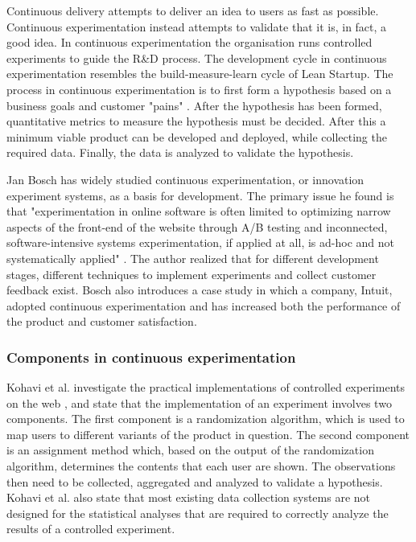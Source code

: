 \documentclass[english]{tktltiki2}
\theoremstyle{definition}
\theoremstyle{remark}
\begin{document}
Continuous delivery attempts to deliver an idea to users as fast as possible. Continuous experimentation instead attempts to validate that it is, in fact, a good idea. In continuous experimentation the organisation runs controlled experiments to guide the R\&D process. The development cycle in continuous experimentation resembles the build-measure-learn cycle of Lean Startup. The process in continuous experimentation is to first form a hypothesis based on a business goals and customer "pains" \cite{bosch2012building}. After the hypothesis has been formed, quantitative metrics to measure the hypothesis must be decided. After this a minimum viable product can be developed and deployed, while collecting the required data. Finally, the data is analyzed to validate the hypothesis.

Jan Bosch has widely studied continuous experimentation, or innovation experiment systems, as a basis for development. The primary issue he found is that "experimentation in online software is often limited to optimizing narrow aspects of the front-end of the website through A/B testing and inconnected, software-intensive systems experimentation, if applied at all, is ad-hoc and not systematically applied" \cite{bosch2012building}. The author realized that for different development stages, different techniques to implement experiments and collect customer feedback exist. Bosch also introduces a case study in which a company, Intuit, adopted continuous experimentation and has increased both the performance of the product and customer satisfaction.

\subsubsection{Components in continuous experimentation}
Kohavi et al. investigate the practical implementations of controlled experiments on the web \cite{kohavi2007practical}, and state that the implementation of an experiment involves two components. The first component is a randomization algorithm, which is used to map users to different variants of the product in question. The second component is an assignment method which, based on the output of the randomization algorithm, determines the contents that each user are shown. The observations then need to be collected, aggregated and analyzed to validate a hypothesis. Kohavi et al. also state that most existing data collection systems are not designed for the statistical analyses that are required to correctly analyze the results of a controlled experiment.
\end{document}
